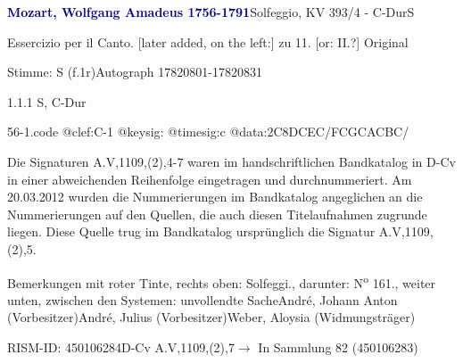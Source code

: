 \documentclass[a4paper, twocolumn, 11pt]{book}
\begin{document}
\par \vspace{16pt} \textcolor{darkblue}{\textbf{Mozart, Wolfgang Amadeus  1756-1791}}\hfillplus{[56]}\newline Solfeggio, KV 393/4 - C-Dur\newline S
\par \begin{itshape} Essercizio per il Canto. [later added, on the left:] zu 11. [or: II.?] Original\end{itshape} 
\par \textcolor{darkblue}{}  Stimme: S  (f.1r)\newline Autograph  17820801-17820831
\par 1.1.1  S, C-Dur  
\begin{filecontents*}{56-1.code}
@clef:C-1
@keysig:
@timesig:c
@data:2C{8DCEC}/{FCGC}{ACBC}/
\end{filecontents*}
\newline %
\par Die Signaturen A.V,1109,(2),4-7 waren im handschriftlichen Bandkatalog in D-Cv in einer abweichenden Reihenfolge eingetragen und durchnummeriert. Am 20.03.2012 wurden die Nummerierungen im Bandkatalog angeglichen an die Nummerierungen auf den Quellen, die auch diesen Titelaufnahmen zugrunde liegen. Diese Quelle trug im Bandkatalog ursprünglich die Signatur A.V,1109,(2),5.
\par Bemerkungen mit roter Tinte, rechts oben: {\textquotedbl}Solfeggi.{\textquotedbl}, darunter: {\textquotedbl}N\textsuperscript{o} 161.{\textquotedbl}, weiter unten, zwischen den Systemen: {\textquotedbl}unvollendte Sache{\textquotedbl}\newline André, Johann Anton  (Vorbesitzer)\newline André, Julius  (Vorbesitzer)\newline Weber, Aloysia  (Widmungsträger)
\par RISM-ID: 450106284\newline D-Cv  A.V,1109,(2),7\newline $\rightarrow$ In Sammlung 82 (450106283)
      
\end{document}
